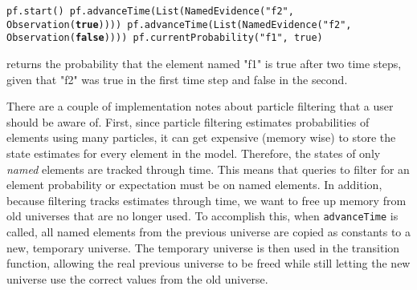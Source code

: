 \begin{flushleft}
\texttt{pf.start()
\newline pf.advanceTime(List(NamedEvidence("f2", Observation(\textbf{true}))))
\newline pf.advanceTime(List(NamedEvidence("f2", Observation(\textbf{false}))))
\newline pf.currentProbability("f1", true)}
\end{flushleft}

returns the probability that the element named "f1" is true after two time steps, given that "f2" was true in the first time step and false in the second.

There are a couple of implementation notes about particle filtering that a user should be aware of. First, since particle filtering estimates probabilities of elements using many particles, it can get expensive (memory wise) to store the state estimates for every element in the model. Therefore, the states of only \emph{named} elements are tracked through time. This means that queries to filter for an element probability or expectation must be on named elements. In addition, because filtering tracks estimates through time, we want to free up memory from old universes that are no longer used. To accomplish this, when \texttt{advanceTime} is called, all named elements from the previous universe are copied as constants to a new, temporary universe. The temporary universe is then used in the transition function, allowing the real previous universe to be freed while still letting the new universe use the correct values from the old universe.

